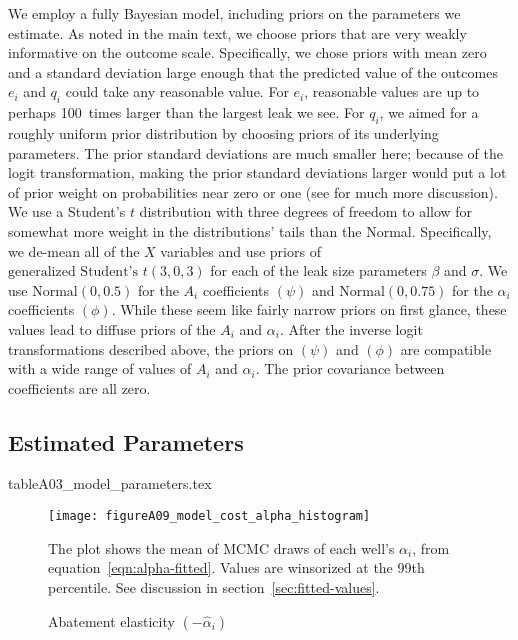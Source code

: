 We employ a fully Bayesian model, including priors on the parameters we estimate.
As noted in the main text, we choose priors that are very weakly informative on the outcome scale.
Specifically, we chose priors with mean zero and a standard deviation large enough that the predicted value of the outcomes \(e_i\) and \(q_i\) could take any reasonable value.
For \(e_i\), reasonable values are up to perhaps 100~times larger than the largest leak we see.
For \(q_i\), we aimed for a roughly uniform prior distribution by choosing priors of its underlying parameters.
The prior standard deviations are much smaller here;
because of the logit transformation, making the prior standard deviations larger would put a lot of prior weight on probabilities near zero or one
(see \cite{Gelman/etal:2020} for much more discussion).
We use a Student's \(t\) distribution with three degrees of freedom to allow for somewhat more weight in the distributions' tails than the Normal.
Specifically, we de-mean all of the \(X\) variables and use priors of
\(\text{generalized Student's } t(3, 0, 3)\) for each of the leak size parameters \(\beta\) and \(\sigma\).
We use \(\text{Normal}(0, 0.5)\) for the \(A_i\) coefficients \((\psi)\) and
\(\text{Normal}(0, 0.75)\) for the \(\alpha_i\) coefficients \((\phi)\).
While these seem like fairly narrow priors on first glance, these values lead to diffuse priors of the \(A_i\) and \(\alpha_i\).
After the inverse logit transformations described above, the priors on \((\psi)\) and \((\phi)\) are compatible with a wide range of values of  \(A_i\) and \(\alpha_i\).
The prior covariance between coefficients are all zero.

\subsection{Estimated Parameters}
\begin{table}[!bthp] %
\vspace*{-0.5\baselineskip}
\centering
{tableA03_model_parameters.tex}
\end{table}


\begin{figure}[!bthp]
  \caption{Abatement elasticity \((-\hat{\alpha}_i)\)}
  \label{fig:histogram-alphas}
  \texttt{[image: figureA09\_model\_cost\_alpha\_histogram]}

The plot shows the mean of \gls{MCMC} draws of each well's \(\alpha_i\), from equation~\ref{eqn:alpha-fitted}.
Values are winsorized at the 99th percentile.
See discussion in section~\ref{sec:fitted-values}.
\end{figure}



